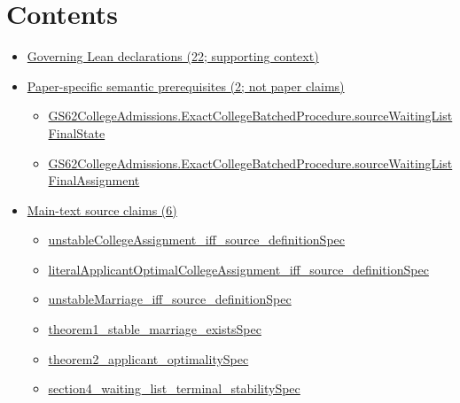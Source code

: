 \documentclass[10pt]{article}
\begin{document}
\section*{Contents}
\begin{itemize}[leftmargin=1.2em]
\item \hyperlink{governing-declaration-section-5ef5ef0364b6939c}{Governing Lean declarations (22; supporting context)}
\item \hyperlink{paper-prerequisite-section-5ef5ef0364b6939c}{Paper-specific semantic prerequisites (2; not paper claims)}
\begin{itemize}[leftmargin=1.2em]
\item \hyperlink{paper-prerequisite-6b7d3de7046692a6}{GS62\allowbreak{}College\allowbreak{}Admissions.\allowbreak{}Exact\allowbreak{}College\allowbreak{}Batched\allowbreak{}Procedure.\allowbreak{}source\allowbreak{}Waiting\allowbreak{}List\allowbreak{}Final\allowbreak{}State}
\item \hyperlink{paper-prerequisite-4b230c4877bf6ef9}{GS62\allowbreak{}College\allowbreak{}Admissions.\allowbreak{}Exact\allowbreak{}College\allowbreak{}Batched\allowbreak{}Procedure.\allowbreak{}source\allowbreak{}Waiting\allowbreak{}List\allowbreak{}Final\allowbreak{}Assignment}
\end{itemize}
\item \hyperlink{source-section-0c7af8265958a9ea}{Main-text source claims (6)}
\begin{itemize}[leftmargin=1.2em]
\item \hyperlink{source-claim-4b269aa42b6f656d}{unstable\allowbreak{}College\allowbreak{}Assignment\_\allowbreak{}iff\_\allowbreak{}source\_\allowbreak{}definition\allowbreak{}Spec}
\item \hyperlink{source-claim-bdf5e4a40e708c9e}{literal\allowbreak{}Applicant\allowbreak{}Optimal\allowbreak{}College\allowbreak{}Assignment\_\allowbreak{}iff\_\allowbreak{}source\_\allowbreak{}definition\allowbreak{}Spec}
\item \hyperlink{source-claim-f836a3d18eeab599}{unstable\allowbreak{}Marriage\_\allowbreak{}iff\_\allowbreak{}source\_\allowbreak{}definition\allowbreak{}Spec}
\item \hyperlink{source-claim-e6bf09e833b5d546}{theorem1\_\allowbreak{}stable\_\allowbreak{}marriage\_\allowbreak{}exists\allowbreak{}Spec}
\item \hyperlink{source-claim-5b11dd2478126734}{theorem2\_\allowbreak{}applicant\_\allowbreak{}optimality\allowbreak{}Spec}
\item \hyperlink{source-claim-defab06662f25c9e}{section4\_\allowbreak{}waiting\_\allowbreak{}list\_\allowbreak{}terminal\_\allowbreak{}stability\allowbreak{}Spec}
\end{itemize}
\end{itemize}
\end{document}
